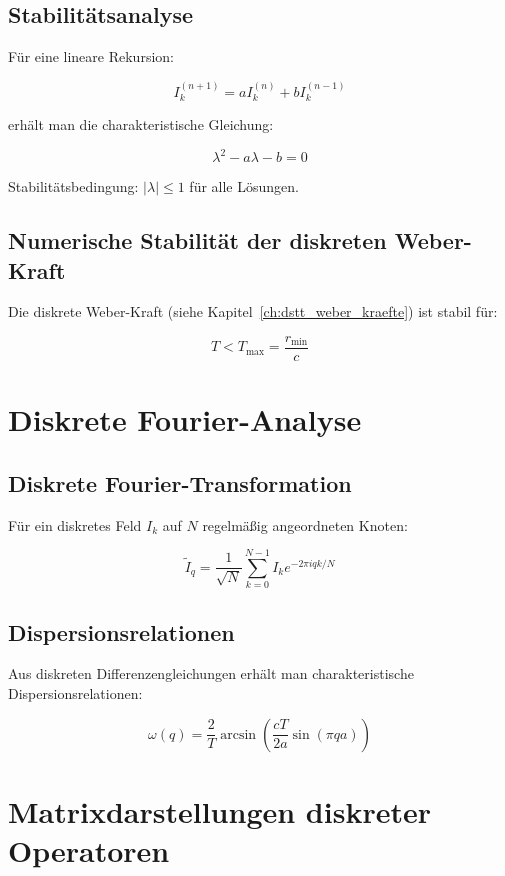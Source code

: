 \subsection{Stabilitätsanalyse}
\label{sub:mathematik_stabilitaet}

Für eine lineare Rekursion:

\[
I_k^{(n+1)} = a I_k^{(n)} + b I_k^{(n-1)}
\]

erhält man die charakteristische Gleichung:

\[
\lambda^2 - a\lambda - b = 0
\]

Stabilitätsbedingung: \( |\lambda| \leq 1 \) für alle Lösungen.

\subsection{Numerische Stabilität der diskreten Weber-Kraft}
\label{sub:mathematik_weber_stabil}

Die diskrete Weber-Kraft (siehe Kapitel~\ref{ch:dstt_weber_kraefte}) ist stabil für:

\[
T < T_{\text{max}} = \frac{r_{\text{min}}}{c}
\]

\section{Diskrete Fourier-Analyse}
\label{app:mathematik_fourier}

\subsection{Diskrete Fourier-Transformation}
\label{sub:mathematik_fourier_trans}

Für ein diskretes Feld \( I_k \) auf \( N \) regelmäßig angeordneten Knoten:

\[
\tilde{I}_q = \frac{1}{\sqrt{N}} \sum_{k=0}^{N-1} I_k e^{-2\pi i q k / N}
\]

\subsection{Dispersionsrelationen}
\label{sub:mathematik_dispersion}

Aus diskreten Differenzengleichungen erhält man charakteristische Dispersionsrelationen:

\[
\omega(q) = \frac{2}{T} \arcsin \left( \frac{cT}{2a} \sin(\pi q a) \right)
\]

\section{Matrixdarstellungen diskreter Operatoren}
\label{app:mathematik_matrix}


